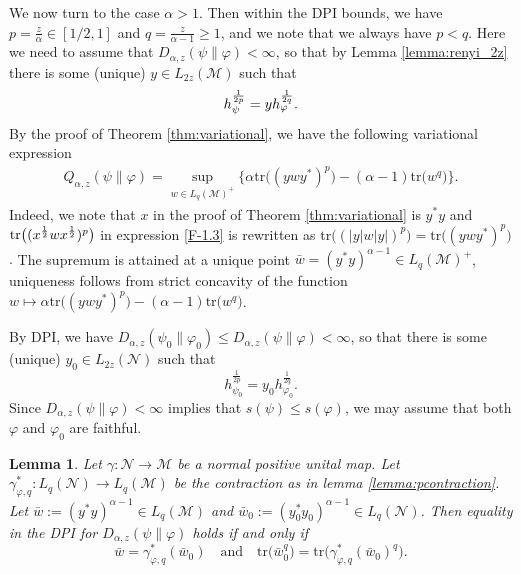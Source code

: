 \documentclass[12pt]{article}
\newtheorem{lemma}[theorem]{Lemma}
\theoremstyle{definition}
\theoremstyle{remark}
\numberwithin{equation}{section}
\def\Me{\mathcal M}
\def\Ne{\mathcal N}
\def\Tr{\mathrm{tr}}
\def\ffi{\varphi}
\begin{document}
We now turn to the case $\alpha>1$. %
Then within the DPI bounds, we have $p=\frac z\alpha\in [1/2,1]$ and
$q=\frac z{\alpha-1}\ge 1$, and we note that we always have $p<q$. Here we need to assume that
$D_{\alpha,z}(\psi\|\ffi)<\infty$, so that by Lemma \ref{lemma:renyi_2z} there is some
(unique) $y\in L_{2z}(\Me)$ such that
\[
h_{\psi}^{1\over 2p}=y h_\ffi^{1\over 2q}.
\]
By the proof of Theorem \ref{thm:variational}, we have the following variational expression
\begin{align}\label{eq:variationalq}
Q_{\alpha,z}(\psi\|\varphi) =\sup_{w\in
L_q(\Me)^+}\bigl\{\alpha\Tr\bigl((ywy^*)^p\bigr)-(\alpha-1)\Tr\bigl(w^q\bigr)\bigr\}.
\end{align}
{Indeed, we note that $x$ in the proof of Theorem \ref{thm:variational} is $y^*y$ and
$\Tr\bigl((x^{1\over2}wx^{1\over2})^p\bigr)$ in expression \eqref{F-1.3} is rewritten as
$\Tr\bigl((|y|w|y|)^p\bigr)=\Tr\bigl((ywy^*)^p\bigr)$.}
The supremum is attained at a unique point $\bar
w=(y^*y)^{\alpha-1}\in L_q(\Me)^+$, uniqueness follows from strict concavity of the
function $w\mapsto \alpha\Tr\bigl((ywy^*)^p\bigr)-(\alpha-1)\Tr\bigl( w^q\bigr)$.


By DPI, we have $D_{\alpha,z}(\psi_0\|\varphi_0)\le D_{\alpha,z}(\psi\|\varphi)<\infty$,
so that there is some (unique) $y_0\in L_{2z}(\Ne)$ such that 
\[
h_{\psi_0}^{\frac1{2p}}=y_0h_{\varphi_0}^{\frac1{2q}}.
\]
Since $D_{\alpha,z}(\psi\|\ffi)<\infty$ implies that $s(\psi)\le s(\ffi)$, we may assume that both $\ffi$ and
$\ffi_0$ are faithful.


\begin{lemma}\label{lemma:le} Let $\gamma:\Ne\to\Me$ be a normal positive unital map. 
Let $\gamma^*_{\ffi,q}:L_q(\Ne)\to L_q(\Me)$ be the contraction as in lemma \ref{lemma:pcontraction}. 
Let $\bar w:=(y^*y)^{\alpha-1}\in L_q(\Me)$ and $\bar w_0:=(y_0^*y_0)^{\alpha-1}\in
L_q(\Ne)$. Then equality in {the DPI for $D_{\alpha,z}(\psi\|\ffi)$} holds if and only if
\begin{equation}\label{eq:dpiw}
\bar w=\gamma^*_{\ffi,q}(\bar w_0)\quad \text{and}\quad  
\Tr\bigl(\bar w_0^q\bigr)=\Tr\bigl(\gamma^*_{\varphi,q}(\bar w_0)^q\bigr).
\end{equation}
\end{lemma}
\end{document}
